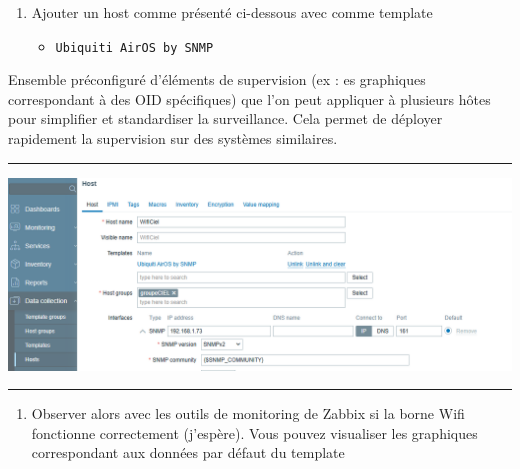 \documentclass[french, 12pt]{article}%
\newcommand{\itemE}{\item[$\bullet$]}
\newcommand{\titreencadre}{Titre}
\newenvironment{encadre}[1]{\renewcommand{\titreencadre}{#1}
	\begin{mdframed}[style=encadrestyle]
	\vspace{0.5\baselineskip}
	}{%
	\end{mdframed}}
\newif\ifPROF
\begin{document}
\ifPROF
\color{red}
Il faut utiliser la commande nmap sur le réseau et regarder si l'on obtient une ligne comme ci-dessous. (SNMP ouvert).
\begin{lstlisting}[style=commande]
nmap -p 161 192.168.1.0/24     

Nmap scan report for NanoHD (192.168.1.122)
Host is up (0.0032s latency).

PORT    STATE SERVICE
161/tcp open  snmp
MAC Address: 78:45:58:FA:AD:2F (Ubiquiti Networks)

\end{lstlisting}
\normalcolor
\fi


\begin{enumerate}[resume]
\item Ajouter un host comme présenté ci-dessous avec comme template
\begin{itemize}
\itemE  \verb?Ubiquiti AirOS by SNMP?
\end{itemize} 
\end{enumerate}

\begin{encadre}{Template}
Ensemble préconfiguré d’éléments de supervision (ex : es graphiques correspondant à des OID spécifiques) que l'on peut appliquer à plusieurs hôtes pour simplifier et standardiser la surveillance. Cela permet de déployer rapidement la supervision sur des systèmes similaires.
\end{encadre}

\begin{center}
 \rule{0.75\linewidth}{1pt}
 \end{center}

\begin{center}
\includegraphics[scale=0.4]{./ressource/wifiSnmp}
\end{center}

\begin{center}
 \rule{0.75\linewidth}{1pt}
 \end{center}

\begin{enumerate}[resume]
\item Observer alors avec les outils de monitoring de Zabbix si la borne Wifi fonctionne correctement (j'espère). Vous pouvez visualiser les graphiques correspondant aux données par défaut du template
\end{enumerate}
\end{document}
